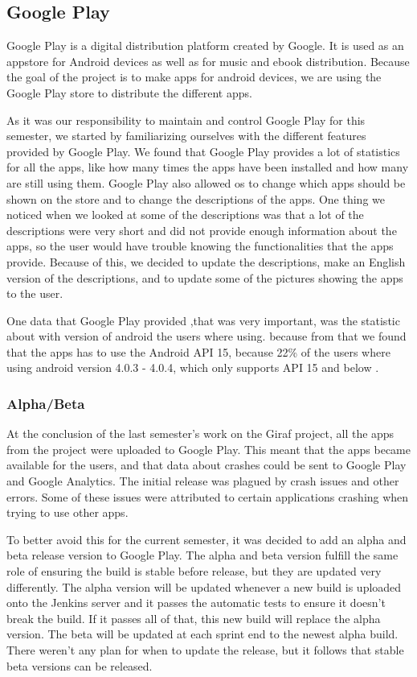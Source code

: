 \subsection{Google Play}
Google Play is a digital distribution platform created by Google. It is used as an appstore for Android devices as well as for music and ebook distribution. Because the goal of the project is to make apps for android devices, we are using the Google Play store to distribute the different apps. \citep{GooglePlay}

As it was our responsibility to maintain and control Google Play for this semester, we started by familiarizing ourselves with the different features provided by Google Play. We found that Google Play provides a lot of statistics for all the apps, like how many times the apps have been installed and how many are still using them. Google Play also allowed os to change which apps should be shown on the store and to change the descriptions of the apps. One thing we noticed when we looked at some of the descriptions was that a lot of the descriptions were very short and did not provide enough information about the apps, so the user would have trouble knowing the functionalities that the apps provide. Because of this, we decided to update the descriptions, make an English version of the descriptions, and to update some of the pictures showing the apps to the user.

One data that Google Play provided ,that was very important, was the statistic about with version of android the users where using. because from that we found that the apps has to use the Android API 15, because 22\% of the users where using android version 4.0.3 - 4.0.4, which only supports API 15 and below \citep{API15}. 

\subsubsection{Alpha/Beta}
At the conclusion of the last semester's work on the Giraf project, all the apps from the project were uploaded to Google Play. This meant that the apps became available for the users, and that data about crashes could be sent to Google Play and Google Analytics. The initial release was plagued by crash issues and other errors. Some of these issues were attributed to certain applications crashing when trying to use other apps.

To better avoid this for the current semester, it was decided to add an alpha and beta release version to Google Play. The alpha and beta version fulfill the same role of ensuring the build is stable before release, but they are updated very differently. The alpha version will be updated whenever a new build is uploaded onto the Jenkins server and it passes the automatic tests to ensure it doesn't break the build. If it passes all of that, this new build will replace the alpha version. The beta will be updated at each sprint end to the newest alpha build. There weren't any plan for when to update the release, but it follows that stable beta versions can be released.

